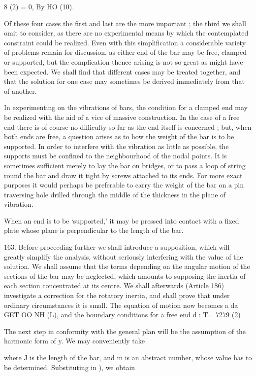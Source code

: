8 (2) = 0, By HO (10).

Of these four cases the first and last are the more important ; the
third we shall omit to consider, as there are no experimental means by
which the contemplated constraint could be realized. Even with this
simplification a considerable variety of problems remain for discussion,
as either end of the bar may be free, clamped or supported, but the
complication thence arising is not so great as might have been expected.
We shall find that different cases may be treated together, and that the
solution for one case may sometimes be derived immediately from that of another.

In experimenting on the vibrations of bars, the condition for a clamped
end may be realized with the aid of a vice of massive construction. In
the case of a free end there is of course no difficulty so far as the
end itself is concerned ; but, when both ends are free, a question
arises as to how the weight of the bar is to be supported. In order to
interfere with the vibration as little as possible, the supports must be
confined to the neighbourhood of the nodal points. It is sometimes
sufficient merely to lay the bar on bridges, or to pass a loop of string
round the bar and draw it tight by screws attached to its ends. For more
exact purposes it would perhaps be preferable to carry the weight of the
bar on a pin traversing hole drilled through the middle of the thickness
in the plane of vibration.

When an end is to be `supported,' it may be pressed into contact with a
fixed plate whose plane is perpendicular to the length of the bar.

163. Before proceeding further we shall introduce a supposition, which
will greatly simplify the analysis, without seriously interfering with
the value of the solution. We shall assume that the terms depending on
the angular motion of the sections of the bar may be neglected, which
amounts to supposing the inertia of each section concentrated at its
centre. We shall afterwards (Article 186) investigate a correction for
the rotatory inertia, and shall prove that under ordinary circumstances
it is small. The equation of motion now becomes
a da GET OO NH (L),
and the boundary conditions for a free end d : T= 7279 (2)

The next step in conformity with the general plan will be the assumption
of the harmonic form of y. We may conveniently take

where J is the length of the bar, and m is an abstract number, whose
value has to be determined. Substituting in ), we obtain

